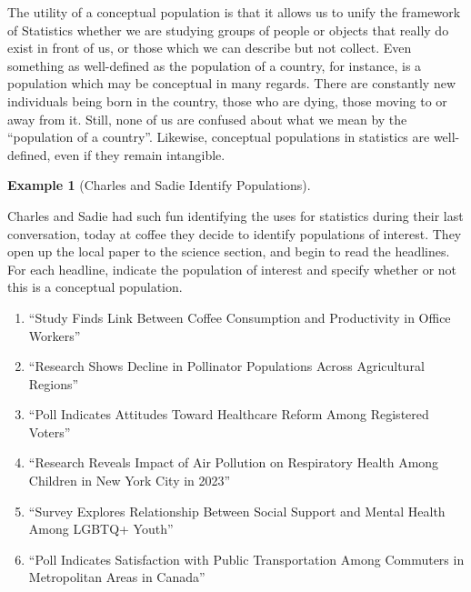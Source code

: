 \documentclass[
  letterpaper,
  DIV=11,
  numbers=noendperiod]{scrreprt}
\providecommand{\tightlist}{%
  \setlength{\itemsep}{0pt}\setlength{\parskip}{0pt}}\usepackage{longtable,booktabs,array}
\theoremstyle{definition}
\theoremstyle{definition}
\newtheorem{example}{Example}[chapter]
\theoremstyle{definition}
\theoremstyle{remark}
\begin{document}
The utility of a conceptual population is that it allows us to unify the
framework of Statistics whether we are studying groups of people or
objects that really do exist in front of us, or those which we can
describe but not collect. Even something as well-defined as the
population of a country, for instance, is a population which may be
conceptual in many regards. There are constantly new individuals being
born in the country, those who are dying, those moving to or away from
it. Still, none of us are confused about what we mean by the
``population of a country''. Likewise, conceptual populations in
statistics are well-defined, even if they remain intangible.

\begin{example}[Charles and Sadie Identify
Populations]\protect\hypertarget{exm-populations}{}\label{exm-populations}

Charles and Sadie had such fun identifying the uses for statistics
during their last conversation, today at coffee they decide to identify
populations of interest. They open up the local paper to the science
section, and begin to read the headlines. For each headline, indicate
the population of interest and specify whether or not this is a
conceptual population.

\begin{enumerate}
\def\labelenumi{\alph{enumi}.}
\tightlist
\item
  ``Study Finds Link Between Coffee Consumption and Productivity in
  Office Workers''
\item
  ``Research Shows Decline in Pollinator Populations Across Agricultural
  Regions''
\item
  ``Poll Indicates Attitudes Toward Healthcare Reform Among Registered
  Voters''
\item
  ``Research Reveals Impact of Air Pollution on Respiratory Health Among
  Children in New York City in 2023''
\item
  ``Survey Explores Relationship Between Social Support and Mental
  Health Among LGBTQ+ Youth''
\item
  ``Poll Indicates Satisfaction with Public Transportation Among
  Commuters in Metropolitan Areas in Canada''
\end{enumerate}

\begin{tcolorbox}[enhanced jigsaw, colback=white, colframe=quarto-callout-color-frame, arc=.35mm, leftrule=.75mm, rightrule=.15mm, opacityback=0, breakable, bottomrule=.15mm, left=2mm, toprule=.15mm]


\end{tcolorbox}
\end{example}
\end{document}
